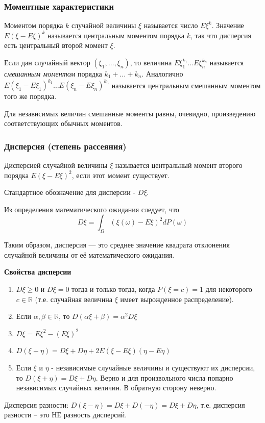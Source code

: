 \subsubsection{Моментные характеристики}

\begin{definition}[Момент]
	Моментом порядка $k$ случайной величины $\xi$ называется число $E\xi^k$. Значение $E(\xi - E\xi)^k$ называется центральным моментом порядка $k$, так что дисперсия есть центральный второй момент $\xi$.
	
	Если дан случайный вектор $(\xi_1, \dots, \xi_n)$, то величина $E\xi_1^{k_1} \dots E\xi_n^{k_n}$ называется \textit{смешанным моментом} порядка $k_1 + \dots + k_n$. Аналогично $E(\xi_1 - E\xi_1)^{k_1} \dots E(\xi_n - E\xi_n)^{k_n}$ называется центральным смешанным моментом того же порядка.
\end{definition}

Для независимых величин смешанные моменты равны, очевидно, произведению соответствующих обычных моментов.

\subsubsection{Дисперсия (степень рассеяния)}\label{dispersion}

\begin{definition}[Дисперсия]
	Дисперсией случайной величины $\xi$ называется центральный момент второго порядка $E(\xi - E\xi)^2$, если этот момент существует.
	
	Стандартное обозначение для дисперсии - $D\xi$.
	
	Из определения математического ожидания следует, что
	\[ D\xi = \int_{\Omega} ( \xi (\omega) - E\xi )^2 d P(\omega) \]
	
	Таким образом, дисперсия — это среднее значение квадрата отклонения случайной величины от её математического ожидания.
\end{definition}

\begin{center}
	\textbf{Свойства дисперсии}
\end{center}
\begin{enumerate}
	\item $D\xi \ge 0$ и $D\xi = 0$ тогда и только тогда, когда $P(\xi = c) = 1$ для некоторого $c \in \mathbb{R}$ (т.е. случайная величина $\xi$ имеет вырожденное распределение).
	\item Если $\alpha, \beta \in \mathbb{R}$, то $D(\alpha \xi + \beta) = \alpha^2 D\xi$
	\item $D\xi = E\xi^2 - (E\xi)^2$
	\item $D(\xi + \eta) = D\xi + D\eta + 2E (\xi - E\xi) (\eta - E\eta)$
	\item Если $\xi$ и $\eta$ - независимые случайные величины и существуют их дисперсии, то $D(\xi + \eta) = D\xi + D \eta$. Верно и для произвольного числа попарно независимых случайных величин. В обратную сторону неверно.
\end{enumerate}
\begin{remark}
	Дисперсия разности: $D(\xi - \eta) = D\xi + D(-\eta) = D\xi + D\eta$, т.е. дисперсия разности – это НЕ разность дисперсий.
\end{remark}

